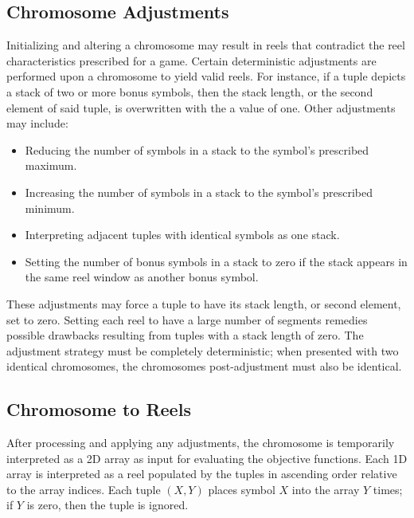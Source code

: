 \documentclass[conference]{IEEEtran}
\begin{document}
\subsection{Chromosome Adjustments}
\label{adjust}
Initializing and altering a chromosome may result in reels that contradict the reel characteristics prescribed for a game.
Certain deterministic adjustments are performed upon a chromosome to yield valid reels.
For instance, if a tuple depicts a stack of two or more bonus symbols, then the stack length, or the second element of said tuple, is overwritten with the a value of one.
Other adjustments may include:
\begin{itemize}
\item Reducing the number of symbols in a stack to the symbol's prescribed maximum.
\item Increasing the number of symbols in a stack to the symbol's prescribed minimum.
\item Interpreting adjacent tuples with identical symbols as one stack.
\item Setting the number of bonus symbols in a stack to zero if the stack appears in the same reel window as another bonus symbol.
\end{itemize}
These adjustments may force a tuple to have its stack length, or second element, set to zero.
Setting each reel to have a large number of segments remedies possible drawbacks resulting from tuples with a stack length of zero.
The adjustment strategy must be completely deterministic; when presented with two identical chromosomes, the chromosomes post-adjustment must also be identical.
\subsection{Chromosome to Reels}
After processing and applying any adjustments, the chromosome is temporarily interpreted as a 2D array as input for evaluating the objective functions.
Each 1D array is interpreted as a reel populated by the tuples in ascending order relative to the array indices.
Each tuple $(X,Y)$ places symbol $X$ into the array $Y$ times; if $Y$ is zero, then the tuple is ignored.
\end{document}
